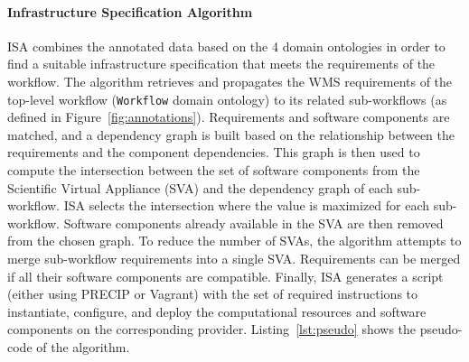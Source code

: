 \paragraph{\textbf{Infrastructure Specification Algorithm}}
ISA combines the annotated data based on the 4 
domain ontologies in order to find a suitable infrastructure specification that meets 
the requirements of the workflow. The algorithm retrieves and propagates the WMS 
requirements of the top-level workflow (\texttt{Workflow} domain ontology) to its 
related sub-workflows (as defined in Figure~\ref{fig:annotations}). Requirements 
and software components are matched, and a dependency graph is built based 
on the relationship between the requirements and the component dependencies. This 
graph is then used to compute the intersection between the set of software components 
from the Scientific Virtual Appliance (SVA) and the dependency graph of each sub-workflow. ISA selects the 
intersection where the value is maximized for each sub-workflow. Software components 
already available in the SVA are then removed from the chosen graph. To reduce 
the number of SVAs, the algorithm attempts to merge sub-workflow requirements 
into a single SVA. Requirements can be merged if all their software components are 
compatible. Finally, ISA generates a script (either using PRECIP or Vagrant) with 
the set of required instructions to instantiate, configure, and deploy the computational 
resources and software components on the corresponding provider. Listing~\ref{lst:pseudo}
shows the pseudo-code of the algorithm.
          
